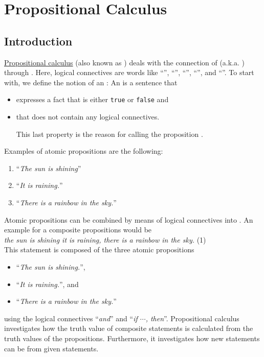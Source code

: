 \chapter{Propositional Calculus}
\section{Introduction}
\href{https://en.wikipedia.org/wiki/Propositional_calculus}{Propositional calculus}
(also known as ) deals with the connection of
(a.k.a. ) through 
.  Here, logical connectives are words like ``'', ``'',
``'', ``'', and ``''.  To
start with, we define the notion of an : An
 is a sentence  that 
\begin{itemize}
\item expresses a fact that is either \texttt{true} or \texttt{false} and
\item that does not contain any logical connectives.

      This last property is the reason for calling the proposition .
\end{itemize}
Examples of atomic propositions are the following:
\begin{enumerate}
\item ``\textsl{The sun is shining}''
\item ``\textsl{It is raining.}''
\item ``\textsl{There is a rainbow in the sky.}''
\end{enumerate}
Atomic propositions can be combined by means of logical connectives
into .  An example for a
composite propositions would be
\\[0.2cm] 
\hspace*{1.3cm}
\textsl{ the sun is shining  it is raining,  there is a rainbow in the sky.} 
\hspace*{\fill} (1)
\\[0.2cm]
This statement is composed of the three atomic propositions
\begin{itemize}
\item ``\textsl{The sun is shining.}'', 
\item ``\textsl{It is raining.}'', and
\item ``\textsl{There is a rainbow in the sky.}''
\end{itemize}
using the logical connectives ``\textsl{and}'' and ``\textsl{if $\cdots$, then}''.
Propositional calculus investigates how the truth value of composite statements is
calculated from the truth values of the propositions.  Furthermore, it investigates
how new statements can be  from given statements. 

